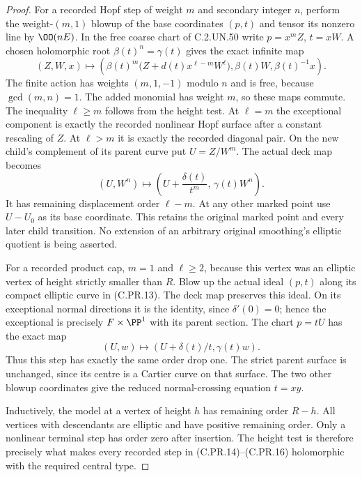 \begin{proof}
For a recorded Hopf step of weight $m$ and secondary integer $n$,
perform the weight-$(m,1)$ blowup of the base coordinates $(p,t)$
and tensor its nonzero line by $\OO(nE)$. In the free coarse
chart of C.2.UN.50 write $p=x^mZ$, $t=xW$.
A chosen holomorphic root $\beta(t)^n=\gamma(t)$ gives the exact
infinite map
\[
 (Z,W,x)\longmapsto
 \left(\beta(t)^m
    \bigl(Z+d(t)x^{\ell-m}W^\ell\bigr),
       \beta(t)W,\beta(t)^{-1}x\right).
                                                        \tag{C.PR.14}
\]
The finite action has weights $(m,1,-1)$ modulo $n$ and is free,
because $\gcd(m,n)=1$. The added monomial has weight $m$,
so these maps commute. The inequality $\ell\ge m$ follows
from the height test. At $\ell=m$ the exceptional component
is exactly the recorded nonlinear Hopf surface after a constant
rescaling of $Z$. At $\ell>m$ it is exactly the recorded
diagonal pair. On the new child's complement of its parent curve
put $U=Z/W^m$. The actual deck map becomes
\[
        (U,W^n)\longmapsto
       \left(U+\frac{\delta(t)}{t^m},\,\gamma(t)W^n\right).
                                                        \tag{C.PR.15}
\]
It has remaining displacement order $\ell-m$.
At any other marked point use $U-U_0$ as its base coordinate.
This retains the original marked point and every later child
transition. No extension of an arbitrary original smoothing's
elliptic quotient is being asserted.

For a recorded product cap, $m=1$ and $\ell\ge2$, because this
vertex was an elliptic vertex of height strictly smaller than $R$.
Blow up the actual ideal $(p,t)$ along its compact elliptic
curve in (C.PR.13). The deck map preserves this ideal.
On its exceptional normal directions it is the identity,
since $\delta'(0)=0$; hence the exceptional is precisely
$F\times\PP^1$ with its parent section. The chart $p=tU$
has the exact map
\[
                    (U,w)\longmapsto
          (U+\delta(t)/t,\gamma(t)w).                   \tag{C.PR.16}
\]
Thus this step has exactly the same order drop one. The strict
parent surface is unchanged, since its centre is a Cartier
curve on that surface. The two other blowup coordinates give
the reduced normal-crossing equation $t=xy$.

Inductively, the model at a vertex of height $h$ has remaining
order $R-h$. All vertices with descendants are elliptic and
have positive remaining order. Only a nonlinear terminal step
has order zero after insertion. The height test is therefore
precisely what makes every recorded step in (C.PR.14)--(C.PR.16)
holomorphic with the required central type.


\end{proof}
